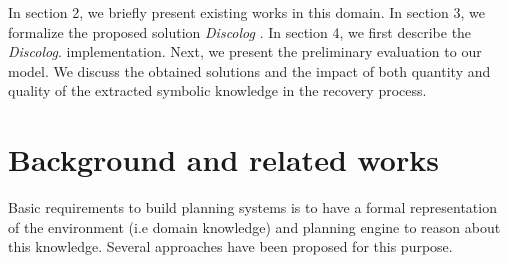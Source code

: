\documentclass[conference]{IEEEtran}
\begin{document}
	\par In section 2, we briefly present existing works in this domain. In section 3, we formalize the proposed solution \textit{Discolog} . In section 4, we first  describe the \textit{Discolog}. implementation. Next, we present the preliminary evaluation to our model. We discuss the obtained solutions and the impact of both quantity and quality of the extracted symbolic knowledge in the recovery process. 
	
	\section{Background and related works}
	Basic requirements to build planning systems is to have a formal representation of the environment (i.e domain knowledge) and planning engine to reason about this knowledge. Several approaches have been proposed for this purpose. 
	
\end{document}
